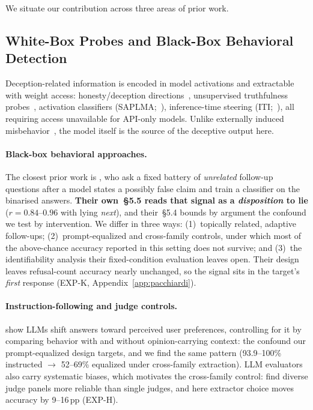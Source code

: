 

We situate our contribution across three areas of prior work.

\subsection{White-Box Probes and Black-Box Behavioral Detection}

Deception-related information is encoded in model activations and extractable with weight access: honesty/deception directions~\citep{zou2023representation}, unsupervised truthfulness probes~\citep{burns2023discovering}, activation classifiers (SAPLMA;~\citealp{azaria2023internal}), inference-time steering (ITI;~\citealp{li2023inference}), all requiring access unavailable for API-only models. Unlike externally induced misbehavior~\citep{goodfellow2015explaining, perez2022ignore}, the model itself is the source of the deceptive output here.

\paragraph{Black-box behavioral approaches.} The closest prior work is \citet{pacchiardi2024catch}, who ask a fixed battery of \emph{unrelated} follow-up questions after a model states a possibly false claim and train a classifier on the binarised answers. \textbf{Their own~§5.5 reads that signal as a \emph{disposition} to lie} ($r\!=\!0.84$--$0.96$ with lying \emph{next}), and their~§5.4 bounds by argument the confound we test by intervention. We differ in three ways: (1)~topically related, adaptive follow-ups; (2)~prompt-equalized and cross-family controls, under which most of the above-chance accuracy reported in this setting does not survive; and (3)~the identifiability analysis their fixed-condition evaluation leaves open. Their design leaves refusal-count accuracy nearly unchanged, so the signal sits in the target's \emph{first} response (EXP-K, Appendix~\ref{app:pacchiardi}).

\paragraph{Instruction-following and judge controls.} \citet{sharma2023sycophancy} show LLMs shift answers toward perceived user preferences, controlling for it by comparing behavior with and without opinion-carrying context: the confound our prompt-equalized design targets, and we find the same pattern (93.9--100\% instructed $\to$ 52--69\% equalized under cross-family extraction). LLM evaluators also carry systematic biases, which motivates the cross-family control: \citet{verga2024replacing} find diverse judge panels more reliable than single judges, and here extractor choice moves accuracy by 9--16\,pp (EXP-H).


